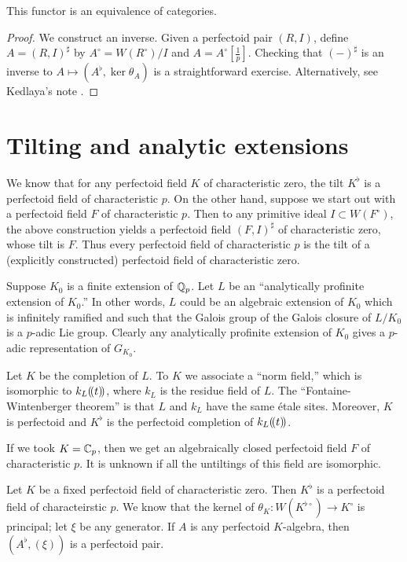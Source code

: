 \documentclass{article}
\begin{document}
\begin{theorem}
This functor is an equivalence of categories.
\end{theorem}
\begin{proof}
We construct an inverse. Given a perfectoid pair $(R,I)$, define 
$A=(R,I)^\sharp$ by $A^\circ =W(R^\circ)/I$ and $A=A^\circ[\frac 1 p]$. 
Checking that $(-)^\sharp$ is an inverse to 
$A\mapsto (A^\flat, \ker\theta_A)$ is a straightforward exercise. 
Alternatively, see Kedlaya's note \cite{ke13}. 
\end{proof}





\section{Tilting and analytic extensions}

We know that for any perfectoid field $K$ of characteristic zero, the tilt 
$K^\flat$ is a perfectoid field of characteristic $p$. On the other hand, 
suppose we start out with a perfectoid field $F$ of characteristic $p$. 
Then to any primitive ideal $I\subset W(F^\circ)$, the above construction 
yields a perfectoid field $(F,I)^\sharp$ of characteristic zero, whose tilt is 
$F$. Thus every perfectoid field of characteristic $p$ is the tilt of a 
(explicitly constructed) perfectoid field of characteristic zero. 

Suppose $K_0$ is a finite extension of $\mathbb{Q}_p$. Let $L$ be an ``analytically 
profinite extension of $K_0$.'' In other words, $L$ could be an algebraic extension 
of $K_0$ which is infinitely ramified and such that the Galois group of the Galois 
closure of $L/K_0$ is a $p$-adic Lie group. Clearly any analytically profinite 
extension of $K_0$ gives a $p$-adic representation of $G_{K_0}$. 

Let $K$ be the completion of $L$. To $K$ we associate a ``norm field,'' which is 
isomorphic to $k_L(\!( {t} )\!)$, where $k_L$ is the residue field of $L$. The 
``Fontaine-Wintenberger theorem'' is that $L$ and $k_L$ have the same 
\'etale sites. Moreover, $K$ is perfectoid and 
$K^\flat$ is the perfectoid completion of $k_L(\!( {t} )\!)$. 

If we took $K=\mathbb{C}_p$, then we get an algebraically closed perfectoid field 
$F$ of characteristic $p$. It is unknown if all the untiltings of this field 
are isomorphic. 

Let $K$ be a fixed perfectoid field of characteristic zero. Then $K^\flat$ is a 
perfectoid field of characteirstic $p$. We know that the kernel of  
$\theta_K:W(K^{\flat\circ}) \to K^\circ$ is principal; let $\xi$ be any 
generator. If $A$ is any perfectoid $K$-algebra, then 
$(A^\flat,(\xi))$ is a perfectoid pair. 
\end{document}
